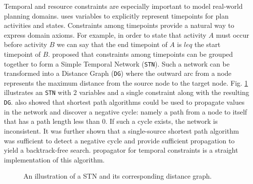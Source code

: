 Temporal and resource constraints are especially important to model
real-world planning domains. %
\eu uses variables to explicitly represent timepoints for plan
activities and states. Constraints among timepoints provide a natural
way to express domain axioms. For example, in order to state that
activity $A$ must occur before activity $B$ we can say that the end
timepoint of $A$ is $leq$ the start timepoint of $B$.
\cite{dechter91} proposed that constraints among timepoints can be
grouped together to form a Simple Temporal Network
(\texttt{STN}). Such a network can be transformed into a Distance
Graph (\texttt{DG}) where the outward arc from a node represents the
maximum distance from the source node to the target node.
Fig. \ref{fig:stn} illustrates an \texttt{STN} with $2$ variables and
a single constraint along with the resulting \texttt{DG}.
\cite{dechter91} also showed that shortest path algorithms could be
used to propagate values in the network and discover a negative cycle:
namely a path from a node to itself that has a path length less than
$0$. If such a cycle exists, the network is inconsistent. It was
further shown that a single-source shortest path algorithm was
sufficient to detect a negative cycle and provide sufficient
propagation to yield a backtrack-free search. \eus propagator for
temporal constraints is a straight implementation of this algorithm.

\begin{figure}[!htb]
  \centering
  \caption{\small An illustration of a STN and its corresponding
    distance graph.}
  \label{fig:stn}
\end{figure}

